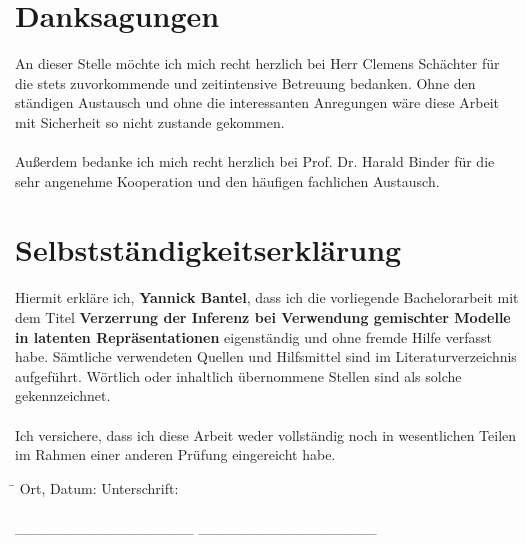 \documentclass[%
thesis=student,%
coverpage=false,%
titlepage=false,%
headmarks=true, %
german,%
font=libertine, %
math=newpxtx, %
BCOR=5mm,%
coverBCOR=11mm%
]{tumbook}
\theoremstyle{break}
\begin{document}
\section*{Danksagungen}
An dieser Stelle möchte ich mich recht herzlich bei Herr Clemens Schächter für die stets zuvorkommende und zeitintensive Betreuung bedanken. Ohne den ständigen Austausch und ohne die interessanten Anregungen wäre diese Arbeit mit Sicherheit so nicht zustande gekommen.\\
\\
Außerdem bedanke ich mich recht herzlich bei Prof. Dr. Harald Binder für die sehr angenehme Kooperation und den häufigen fachlichen Austausch. 
\newpage
\section*{Selbstständigkeitserklärung}
Hiermit erkläre ich, \textbf{Yannick Bantel}, dass ich die vorliegende Bachelorarbeit mit dem Titel \textbf{Verzerrung der Inferenz bei Verwendung gemischter Modelle in latenten Repräsentationen} eigenständig und ohne fremde Hilfe verfasst habe. Sämtliche verwendeten Quellen und Hilfsmittel sind im Literaturverzeichnis aufgeführt. Wörtlich oder inhaltlich übernommene Stellen sind als solche gekennzeichnet.\\
\\
Ich versichere, dass ich diese Arbeit weder vollständig noch in wesentlichen Teilen im Rahmen einer anderen Prüfung eingereicht habe.\\

\vspace{2cm}

\begin{flushleft}
	\begin{tabbing}
		\hspace{8cm} \= \hspace{4cm} \kill
		Ort, Datum: \> Unterschrift: \\
		\\
		\_\_\_\_\_\_\_\_\_\_\_\_\_\_\_\_\_ \> \_\_\_\_\_\_\_\_\_\_\_\_\_\_\_\_\_
	\end{tabbing}
\end{flushleft}
\end{document}
